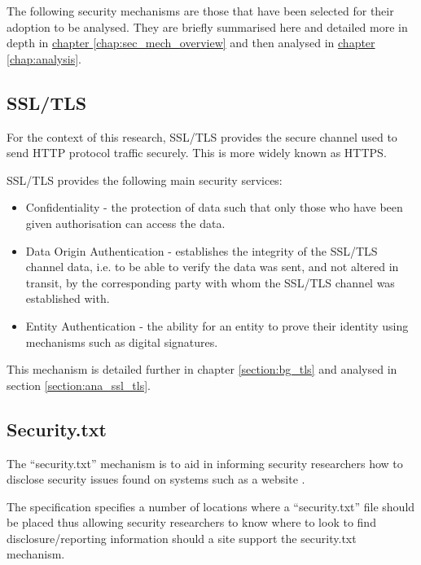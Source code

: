 \documentclass{mscreport}
\begin{document}
The following security mechanisms are those that have been selected for their adoption to be analysed. They are briefly summarised here and detailed more in depth in \hyperref[chap:sec_mech_overview]{chapter \ref{chap:sec_mech_overview}} and then analysed in \hyperref[chap:analysis]{chapter \ref{chap:analysis}}.


\subsection{SSL/TLS}
\label{section:ssm_tls}
For the context of this research, SSL/TLS provides the secure channel used to send HTTP protocol traffic securely. This is more widely known as HTTPS.

\vspace{0.3cm} \noindent
SSL/TLS provides the following main security services:

\begin{itemize}
	\setlength\itemsep{0.1em}
	\item Confidentiality - the protection of data such that only those who have been given authorisation can access the data.
	\item Data Origin Authentication - establishes the integrity of the SSL/TLS channel data, i.e. to be able to verify the data was sent, and not altered in transit, by the corresponding party with whom the SSL/TLS channel was established with.
	\item Entity Authentication - the ability for an entity to prove their identity using mechanisms such as digital signatures.
\end{itemize}

\noindent
This mechanism is detailed further in chapter \ref{section:bg_tls} and analysed in section \ref{section:ana_ssl_tls}.


\subsection{Security.txt}
The ``security.txt'' mechanism is to aid in informing security researchers how to disclose security issues found on systems such as a website \cite{Foudil2021-vh}.

\vspace{0.3cm} \noindent
The specification specifies a number of locations where a ``security.txt'' file should be placed thus allowing security researchers to know where to look to find disclosure/reporting information should a site support the security.txt mechanism.
\end{document}
